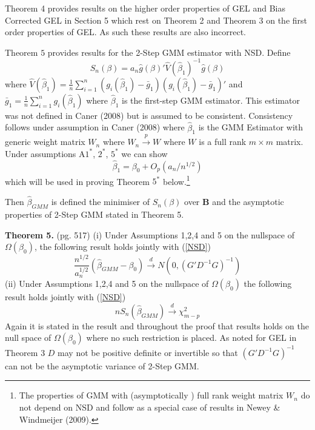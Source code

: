 \documentclass[11pt, fleqn]{article}
\begin{document}
Theorem 4  provides results on the higher order properties  of GEL and Bias Corrected GEL in Section 5 which rest on Theorem 2 and Theorem 3  on the first order properties of GEL. As such these results are also incorrect.

Theorem $5$ provides results for the 2-Step GMM estimator with NSD. Define
\begin{equation} S_n(\beta)=a_n\hat{g}(\beta)'\hat{V}(\hat{\beta}_1)^{-1}\hat{g}(\beta) \end{equation}
where $\hat{V}(\hat{\beta}_1)=\frac{1}{n}\sum_{i=1}^n(g_i(\hat{\beta}_1)-\bar{g}_1)(g_i(\hat{\beta}_1)-\bar{g}_1)'$
and $\bar{g}_1=\frac{1}{n}\sum_{i=1}^n g_i(\hat{\beta}_1)$ where $\hat{\beta}_1$ is the first-step GMM estimator. This estimator was not defined in Caner (2008) but is assumed  to be consistent. Consistency follows under assumption in Caner (2008) where $\hat{\beta}_1$ is the GMM Estimator with generic weight matrix $W_n$ where $W_n\overset{p}{\rightarrow} W$ where $W$ is a full rank $m\times m $ matrix. Under assumptions A$1^*$, $2^*$, $5^*$ we can show
\begin{equation} \label{first} \hat{\beta}_1=\beta_0+ O_p(a_n/n^{1/2})\end{equation}
which will be used in proving Theorem $5^*$ below.\footnote{ The properties of GMM with  (asymptotically ) full rank weight matrix $W_n$ do not depend on NSD  and follow as a special case of results in Newey \& Windmeijer (2009).}


Then $\hat{\beta}_{GMM}$ is defined the minimiser of $S_n(\beta)$ over $\mathbf{B}$ and the asymptotic properties of 2-Step GMM stated in Theorem 5.\newline

\textbf{Theorem 5.} (pg. 517) (i) Under Assumptions 1,2,4 and 5 on the nullspace of $\Omega(\beta_0)$, the following result holds jointly with (\ref{NSD})
\begin{equation}\label{GMM} \frac{n^{1/2}}{a_n^{1/2}}(\hat{\beta}_{GMM}-\beta_0) \overset{d}{\rightarrow} N(0, (G'D^{-1}G)^{-1}) \end{equation}
(ii) Under Assumptions 1,2,4 and 5 on the nullspace of $\Omega(\beta_0)$ the following result holds jointly with (\ref{NSD})\begin{equation} \label{Q} nS_n(\hat{\beta}_{GMM}) \overset{d}{\rightarrow} \chi^2_{m-p}\end{equation}
Again it is stated in the result and throughout the proof that results holds on the null space of $\Omega(\beta_0)$ where no such  restriction is placed. As noted for GEL in Theorem 3 $D$ may not be positive definite or invertible so that $(G'D^{-1}G)^{-1}$ can not be the asymptotic variance of 2-Step GMM.
\end{document}
